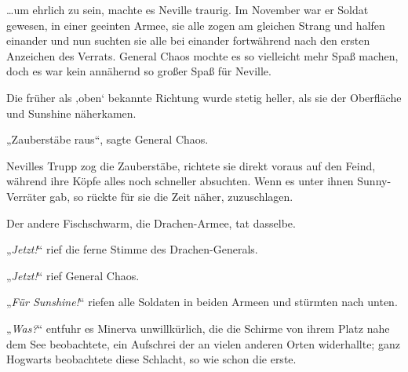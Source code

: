 …um ehrlich zu sein, machte es Neville traurig. Im November war er Soldat gewesen, in einer geeinten Armee, sie alle zogen am gleichen Strang und halfen einander und nun suchten sie alle bei einander fortwährend nach den ersten Anzeichen des Verrats. General Chaos mochte es so vielleicht mehr Spaß machen, doch es war kein annähernd so großer Spaß für Neville.

Die früher als ‚oben‘ bekannte Richtung wurde stetig heller, als sie der Oberfläche und Sunshine näherkamen.

„Zauberstäbe raus“, sagte General Chaos.

Nevilles Trupp zog die Zauberstäbe, richtete sie direkt voraus auf den Feind, während ihre Köpfe alles noch schneller absuchten. Wenn es unter ihnen Sunny-Verräter gab, so rückte für sie die Zeit näher, zuzuschlagen.

Der andere Fischschwarm, die Drachen-Armee, tat dasselbe.

„\emph{Jetzt!}“ rief die ferne Stimme des Drachen-Generals.

„\emph{Jetzt!}“ rief General Chaos.

„\emph{Für Sunshine!}“ riefen alle Soldaten in beiden Armeen und stürmten nach unten.

\later

„\emph{Was?}“ entfuhr es Minerva unwillkürlich, die die Schirme von ihrem Platz nahe dem See beobachtete, ein Aufschrei der an vielen anderen Orten widerhallte; ganz Hogwarts beobachtete diese Schlacht, so wie schon die erste.

